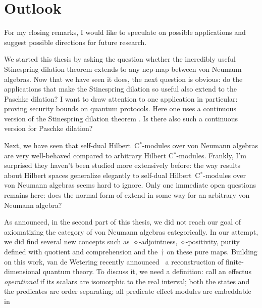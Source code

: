 \documentclass[b]{subfiles}
\begin{document}
\chapter{Outlook}
\begin{parsec}%
\begin{point}%
For my closing remarks, I would like to speculate
    on possible applications
    and suggest possible
        directions for future research.

We started this thesis by asking the question
    whether the incredibly useful Stinespring dilation theorem
    extends to any ncp-map between von Neumann algebras.
Now that we have seen it does, the next question is obvious:
    do the applications that make the Stinespring dilation so useful
    also extend to the Paschke dilation?
I want to draw attention to one application in particular:
    proving security bounds on quantum protocols.
Here one uses a continuous version
    of the Stinespring dilation theorem \cite{werner2}.
Is there also such a continuous version for Paschke dilation?
\begin{point}%
Next, we have seen that self-dual Hilbert~C$^*$-modules
    over von Neumann algebras
    are very well-behaved compared
    to arbitrary Hilbert C$^*$-modules.
    Frankly, I'm surprised they haven't been studied
        more extensively before:
        the way results about Hilbert spaces
        generalize elegantly to self-dual Hilbert~C$^*$-modules
        over von Neumann algebras seems hard to ignore.
Only one immediate open questions remains here:
    does the normal form of 
    extend in some way for an arbitrary von Neumann algebra?
\end{point}
\begin{point}%
As announced, in the second part of this thesis, we did not reach
    our goal of axiomatizing the category of von Neumann algebras
    categorically.
In our attempt, we did find several new concepts
    such as~$\diamond$-adjointness, $\diamond$-positivity,
        purity defined with quotient and comprehension and
        the~$\dagger$ on these pure maps.
Building on this work,
    van de Wetering recently announced~\cite{wetering}
    a reconstruction of finite-dimensional quantum theory.
    To discuss it, we need a definition: call an effectus \emph{operational}
        if its scalars are isomorphic to the real interval;
        both the states and the predicates are order separating;
        all predicate effect modules are embeddable in

\end{point}
\end{point}
\end{parsec}
\end{document}
